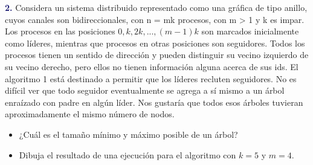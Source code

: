 \newpage
\textbf{\textcolor{MidnightBlue}{2.}}
 Considera un sistema distribuido representado como una gráfica de tipo anillo, cuyos
canales son bidireccionales, con n = mk procesos, con m > 1 y k es impar. Los procesos en las
posiciones $0, k, 2k, . . . ,(m-1)k$ son marcados inicialmente como líderes, mientras que procesos
en otras posiciones son seguidores. Todos los procesos tienen un sentido de dirección y pueden
distinguir su vecino izquierdo de su vecino derecho, pero ellos no tienen información alguna
acerca de sus ids.
El algoritmo 1 está destinado a permitir que los líderes recluten seguidores. No es difícil ver que
todo seguidor eventualmente se agrega a sí mismo a un árbol enraízado con padre en algún líder.
Nos gustaría que todos esos árboles tuvieran aproximadamente el mismo número de nodos.

\begin{itemize}
	\item ¿Cuál es el tamaño mínimo y máximo posible de un árbol?
	 \item Dibuja el resultado de una ejecución para el algoritmo con $k = 5$  y $m = 4.$
\end{itemize}